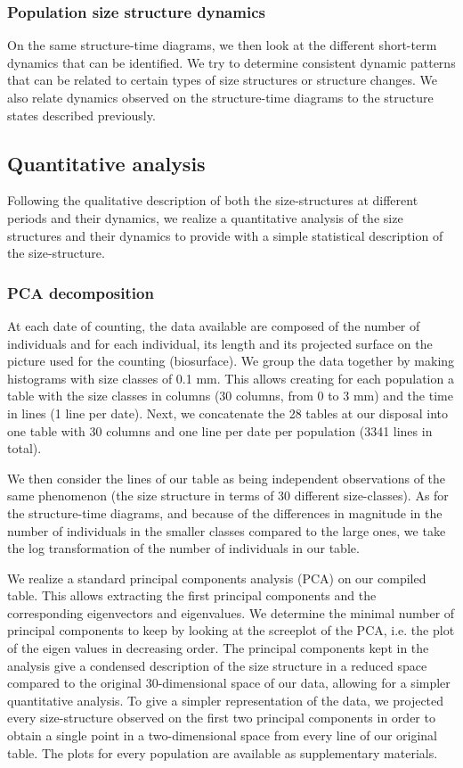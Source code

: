 \subsubsection{Population size structure dynamics}

On the same structure-time diagrams, we then look at the different short-term
dynamics that can be identified. We try to determine consistent dynamic patterns
that can be related to certain types of size structures or structure changes. We
also relate dynamics observed on the structure-time diagrams to the structure
states described previously.

\subsection{Quantitative analysis}

Following the qualitative description of both the size-structures at different
periods and their dynamics, we realize a quantitative analysis of the size
structures and their dynamics to provide with a simple statistical description
of the size-structure.

\subsubsection{PCA decomposition}

At each date of counting, the data available are composed of the number of
individuals and for each individual, its length and its projected surface on the
picture used for the counting (biosurface). We group the data together by making
histograms with size classes of 0.1 mm. This allows creating for each population
a table with the size classes in columns (30 columns, from 0 to 3 mm) and the
time in lines (1 line per date). Next, we concatenate the 28 tables at our
disposal into one table with 30 columns and one line per date per population
(3341 lines in total).

We then consider the lines of our table as being independent observations of the
same phenomenon (the size structure in terms of 30 different size-classes). As
for the structure-time diagrams, and because of the differences in magnitude in the
number of individuals in the smaller classes compared to the large ones, we take
the log transformation of the number of individuals in our table.

We realize a standard principal components analysis (PCA) on our compiled table.
This allows extracting the first principal components and the corresponding
eigenvectors and eigenvalues. We determine the minimal number of principal
components to keep by looking at the screeplot of the PCA, i.e. the plot of the
eigen values in decreasing order. The principal components kept in the analysis
give a condensed description of the size structure in a reduced space compared
to the original 30-dimensional space of our data, allowing for a simpler
quantitative analysis. To give a simpler representation of the data, we
projected every size-structure observed on the first two principal components in
order to obtain a single point in a two-dimensional space from every line of our
original table. The plots for every population are available as supplementary
materials.

